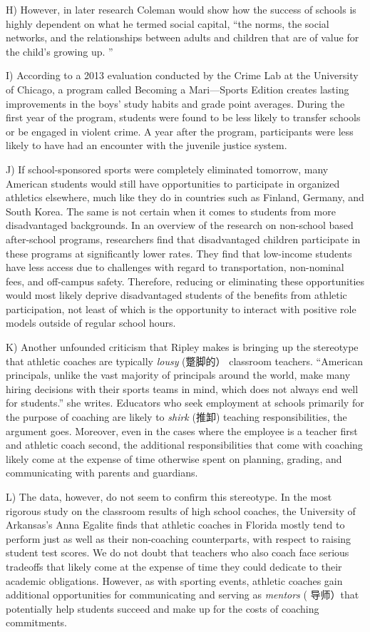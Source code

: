 \documentclass[UTF8,11pt]{ctexart}
\begin{document}
H) However, in later research Coleman would show how the success of schools is highly dependent on what he termed social capital, “the norms, the social networks, and the relationships between adults and children that are of value for the child’s growing up. ”


I) According to a 2013 evaluation conducted by the Crime Lab at the University of Chicago, a program called Becoming a Mari—Sports Edition creates lasting improvements in the boys’ study habits and grade point averages. During the first year of the program, students were found to be less likely to transfer schools or be engaged in violent crime. A year after the program, participants were less likely to have had an encounter with the juvenile justice system.


J) If school-sponsored sports were completely eliminated tomorrow, many American students would still have opportunities to participate in organized athletics elsewhere, much like they do in countries such as Finland, Germany, and South Korea. The same is not certain when it comes to students from more disadvantaged backgrounds. In an overview of the research on non-school based after-school programs, researchers find that disadvantaged children participate in these programs at significantly lower rates. They find that low-income students have less access due to challenges with regard to transportation, non-nominal fees, and off-campus safety. Therefore, reducing or eliminating these opportunities would most likely deprive disadvantaged students of the benefits from athletic participation, not least of which is the opportunity to interact with positive role models outside of regular school hours.


K) Another unfounded criticism that Ripley makes is bringing up the stereotype that athletic coaches are typically\textit{ lousy} (蹩脚的） classroom teachers. “American principals, unlike the vast majority of principals around the world, make many hiring decisions with their sports teams in mind, which does not always end well for students.” she writes. Educators who seek employment at schools primarily for the purpose of coaching are likely to\textit{ shirk} (推卸) teaching responsibilities, the argument goes. Moreover, even in the cases where the employee is a teacher first and athletic coach second, the additional responsibilities that come with coaching likely come at the expense of time otherwise spent on planning, grading, and communicating with parents and guardians.


L) The data, however, do not seem to confirm this stereotype. In the most rigorous study on the classroom results of high school coaches, the University of Arkansas’s Anna Egalite finds that athletic coaches in Florida mostly tend to perform just as well as their non-coaching counterparts, with respect to raising student test scores. We do not doubt that teachers who also coach face serious tradeoffs that likely come at the expense of time they could dedicate to their academic obligations. However, as with sporting events, athletic coaches gain additional opportunities for communicating and serving as\textit{ mentors} ( 导师）that potentially help students succeed and make up for the costs of coaching commitments.
\end{document}
